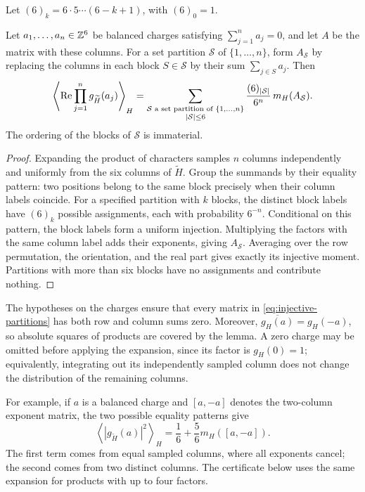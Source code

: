 Let $(6)_k=6\cdot5\cdots(6-k+1)$, with $(6)_0=1$.

\begin{lemma}
\label{lem:partitions}
Let $a_1,\ldots,a_n\in\mathbb Z^6$ be balanced charges satisfying
$\sum_{j=1}^n a_j=0$, and let $A$ be the matrix with these columns.
For a set partition $\mathcal S$ of $\{1,\ldots,n\}$, form
$A_{\mathcal S}$ by replacing the columns in each block $S\in\mathcal S$
by their sum $\sum_{j\in S}a_j$.  Then
\begin{equation}
  \left\langle
    \operatorname{Re}\prod_{j=1}^n g_{\widetilde H}(a_j)
  \right\rangle_H
  =\sum_{\substack{\mathcal S\text{ a set partition of }\{1,\ldots,n\}\\
                    |\mathcal S|\leq6}}
       \frac{(6)_{|\mathcal S|}}{6^n}\,
       m_H(A_{\mathcal S}).
  \label{eq:injective-partitions}
\end{equation}
The ordering of the blocks of $\mathcal S$ is immaterial.
\end{lemma}

\begin{proof}
Expanding the product of characters samples $n$ columns independently
and uniformly from the six columns of $\widetilde H$.  Group the
summands by their equality pattern: two positions belong to the same
block precisely when their column labels coincide.  For a specified
partition with $k$ blocks, the distinct block labels have $(6)_k$
possible assignments, each with probability $6^{-n}$.  Conditional on
this pattern, the block labels form a uniform injection.  Multiplying
the factors with the same column label adds their exponents, giving
$A_{\mathcal S}$.  Averaging over the row permutation, the orientation,
and the real part gives exactly its injective moment.  Partitions with
more than six blocks have no assignments and contribute nothing.
\end{proof}

The hypotheses on the charges ensure that every matrix in
\eqref{eq:injective-partitions} has both row and column sums zero.
Moreover, $\overline{g_H(a)}=g_H(-a)$, so absolute squares of products
are covered by the lemma.  A zero charge may be omitted before applying
the expansion, since its factor is $g_H(0)=1$; equivalently, integrating
out its independently sampled column does not change the distribution
of the remaining columns.

For example, if $a$ is a balanced charge and $[a,-a]$ denotes the
two-column exponent matrix, the two possible equality patterns give
\[
 \left\langle |g_{\widetilde H}(a)|^2\right\rangle_H
 =\frac16+\frac56m_H([a,-a]).
\]
The first term comes from equal sampled columns, where all exponents
cancel; the second comes from two distinct columns. The certificate
below uses the same expansion for products with up to four factors.

